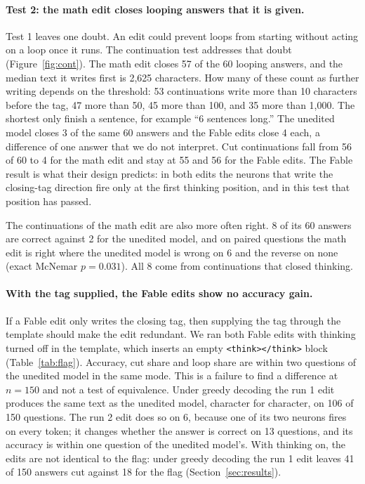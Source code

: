 \documentclass[11pt]{article}
\begin{document}
\paragraph{Test 2: the math edit closes looping answers that it is given.} Test 1 leaves one doubt. An edit could prevent loops from starting without acting on a loop once it runs. The continuation test addresses that doubt (Figure~\ref{fig:cont}). The math edit closes 57 of the 60 looping answers, and the median text it writes first is 2,625 characters. How many of these count as further writing depends on the threshold: 53 continuations write more than 10 characters before the tag, 47 more than 50, 45 more than 100, and 35 more than 1,000. The shortest only finish a sentence, for example ``6 sentences long.'' The unedited model closes 3 of the same 60 answers and the Fable edits close 4 each, a difference of one answer that we do not interpret. Cut continuations fall from 56 of 60 to 4 for the math edit and stay at 55 and 56 for the Fable edits. The Fable result is what their design predicts: in both edits the neurons that write the closing-tag direction fire only at the first thinking position, and in this test that position has passed.

The continuations of the math edit are also more often right. 8 of its 60 answers are correct against 2 for the unedited model, and on paired questions the math edit is right where the unedited model is wrong on 6 and the reverse on none (exact McNemar $p = 0.031$). All 8 come from continuations that closed thinking.

\paragraph{With the tag supplied, the Fable edits show no accuracy gain.} If a Fable edit only writes the closing tag, then supplying the tag through the template should make the edit redundant. We ran both Fable edits with thinking turned off in the template, which inserts an empty \texttt{<think></think>} block (Table~\ref{tab:flag}). Accuracy, cut share and loop share are within two questions of the unedited model in the same mode. This is a failure to find a difference at $n = 150$ and not a test of equivalence. Under greedy decoding the run 1 edit produces the same text as the unedited model, character for character, on 106 of 150 questions. The run 2 edit does so on 6, because one of its two neurons fires on every token; it changes whether the answer is correct on 13 questions, and its accuracy is within one question of the unedited model's. With thinking on, the edits are not identical to the flag: under greedy decoding the run 1 edit leaves 41 of 150 answers cut against 18 for the flag (Section~\ref{sec:results}).
\end{document}
